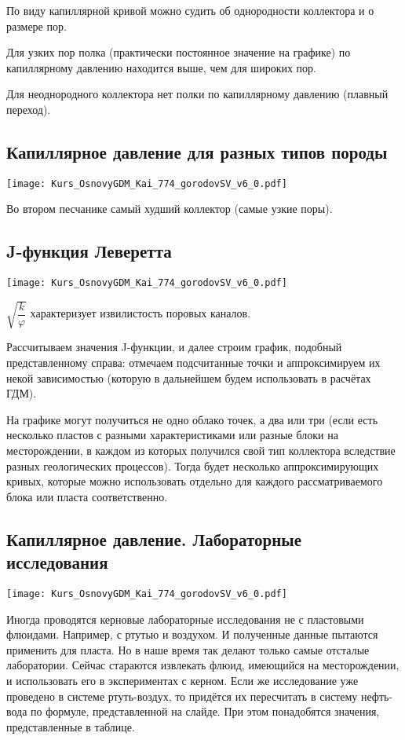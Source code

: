 \documentclass[main.tex]{subfiles}
\begin{document}
По виду капиллярной кривой можно судить об однородности коллектора и о размере пор.

Для узких пор полка (практически постоянное значение на графике) по капиллярному давлению находится выше, чем для широких пор.

Для неоднородного коллектора нет полки по капиллярному давлению (плавный переход).

\subsection{Капиллярное давление для разных типов породы}

\texttt{[image: Kurs\_OsnovyGDM\_Kai\_774\_gorodovSV\_v6\_0.pdf]}

Во втором песчанике самый худший коллектор (самые узкие поры).

\subsection{J-функция Леверетта}

\texttt{[image: Kurs\_OsnovyGDM\_Kai\_774\_gorodovSV\_v6\_0.pdf]}

$\sqrt{\dfrac{k}{\varphi}}$ характеризует извилистость поровых каналов.

Рассчитываем значения J-функции, и далее строим график, подобный представленному справа: отмечаем подсчитанные точки и аппроксимируем их некой зависимостью (которую в дальнейшем будем использовать в расчётах ГДМ).

На графике могут получиться не одно облако точек, а два или три (если есть несколько пластов с разными характеристиками или разные блоки на месторождении, в каждом из которых получился свой тип коллектора вследствие разных геологических процессов).
Тогда будет несколько аппроксимирующих кривых, которые можно использовать отдельно для каждого рассматриваемого блока или пласта соответственно.

\subsection{Капиллярное давление. Лабораторные исследования}

\texttt{[image: Kurs\_OsnovyGDM\_Kai\_774\_gorodovSV\_v6\_0.pdf]}

Иногда проводятся керновые лабораторные исследования не с пластовыми флюидами.
Например, с ртутью и воздухом.
И полученные данные пытаются применить для пласта.
Но в наше время так делают только самые отсталые лаборатории.
Сейчас стараются извлекать флюид, имеющийся на месторождении, и использовать его в экспериментах с керном.
Если же исследование уже проведено в системе ртуть-воздух, то придётся их пересчитать в систему нефть-вода по формуле, представленной на слайде.
При этом понадобятся значения, представленные в таблице.
\end{document}
